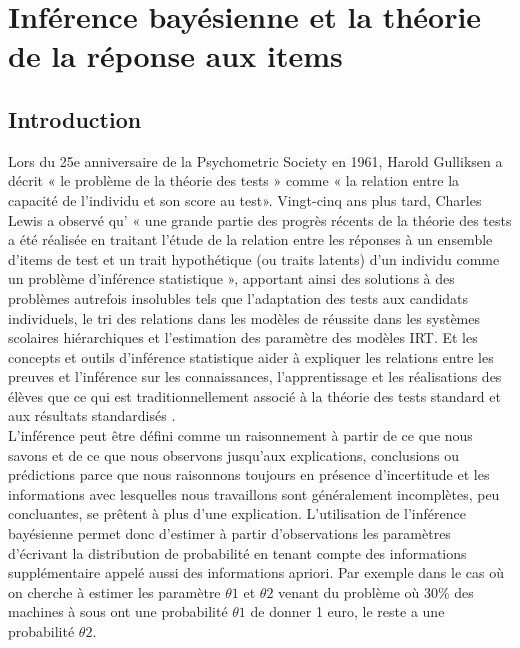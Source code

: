 \chapter{Inférence bayésienne et la théorie de la réponse aux items}
\label{chap:irt}
\minitoc
\thispagestyle{empty}
\newpage

\section{Introduction}
Lors du 25e anniversaire de la Psychometric Society en 1961, Harold Gulliksen a décrit « le problème de la théorie des tests » comme « la relation entre la capacité de l'individu et son score au test». Vingt-cinq ans plus tard, Charles Lewis a observé qu' « une grande partie des progrès récents de la théorie des tests a été réalisée en traitant l'étude de la relation entre les réponses à un ensemble d'items de test et un trait hypothétique (ou traits latents) d'un individu comme un problème d'inférence statistique », apportant ainsi des solutions à des problèmes autrefois insolubles tels que l'adaptation des tests aux candidats individuels, le tri des relations dans les modèles de réussite dans les systèmes scolaires hiérarchiques \cite{aitkin1986statistical} et l’estimation des paramètre des modèles IRT. Et les concepts et outils d'inférence statistique aider à expliquer les relations entre les preuves et l'inférence sur les connaissances, l'apprentissage et les réalisations des élèves que ce qui est traditionnellement associé à la théorie des tests standard et aux résultats standardisés \cite{mislevy1994evidence}. \\
L'inférence peut être défini comme un raisonnement à partir de ce que nous savons et de ce que nous observons jusqu'aux explications, conclusions ou prédictions parce que nous raisonnons toujours en présence d'incertitude et les informations avec lesquelles nous travaillons sont généralement incomplètes, peu concluantes, se prêtent à plus d’une explication. L’utilisation de l’inférence bayésienne permet donc d’estimer à partir d’observations les paramètres d’écrivant la distribution de probabilité en tenant compte des informations supplémentaire appelé aussi des informations apriori. Par exemple dans le cas où on cherche à estimer les paramètre \(\displaystyle \theta1 \) et \(\displaystyle \theta2 \) venant du problème où 30\% des machines à sous ont une probabilité \(\displaystyle \theta1 \)  de donner 1 euro, le reste a une probabilité \(\displaystyle \theta2 \).\\
